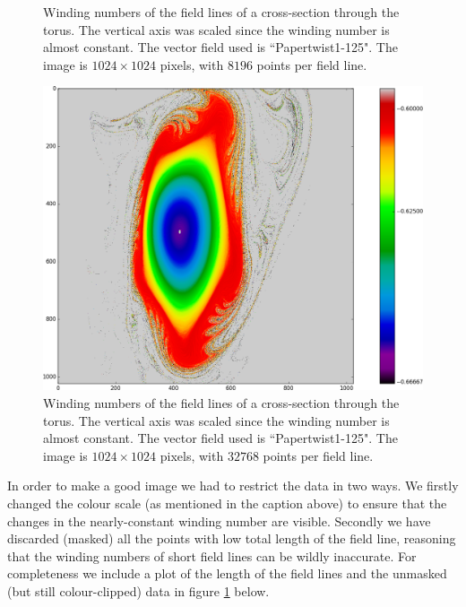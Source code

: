 \documentclass{article}
\begin{document}
\begin{figure}[!htb]
  \caption{Winding numbers of the field lines of a cross-section through the torus. The vertical axis was scaled since the winding number is almost constant. The vector field used is ``Papertwist1-125". The image is $1024\times 1024$ pixels, with $8196$ points per field line.}\label{fig:125-8k}
\endminipage\hfill
{}%
  \includegraphics[width=\linewidth]{Figures/Rings_Papertwist_twist1_125_steps32k.png}
  \caption{Winding numbers of the field lines of a cross-section through the torus. The vertical axis was scaled since the winding number is almost constant. The vector field used is ``Papertwist1-125". The image is $1024\times 1024$ pixels, with $32768$ points per field line.}\label{fig:125-32k}
\endminipage
\end{figure}

In order to make a good image we had to restrict the data in two ways. We firstly changed the colour scale (as mentioned in the caption above) to ensure that the changes in the nearly-constant winding number are visible. Secondly we have discarded (masked) all the points with low total length of the field line, reasoning that the winding numbers of short field lines can be wildly inaccurate. For completeness we include a plot of the length of the field lines and the unmasked (but still colour-clipped) data in figure \ref{fig:125-32k} below.
\end{document}
